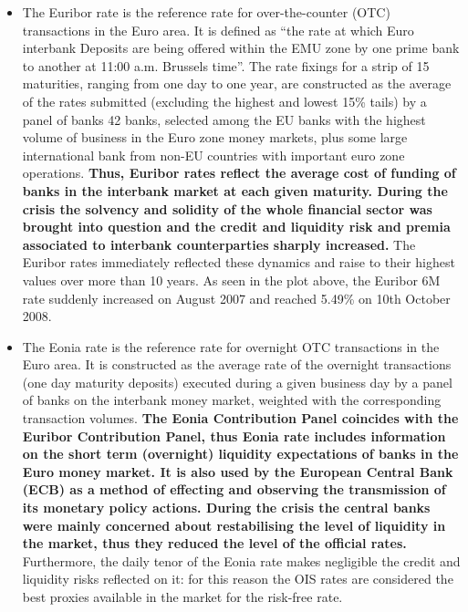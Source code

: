 \begin{itemize}
\tightlist
\item
  The Euribor rate is the reference rate for over-the-counter (OTC)
  transactions in the Euro area. It is defined as ``the rate at which
  Euro interbank Deposits are being offered within the EMU zone by one
  prime bank to another at 11:00 a.m. Brussels time''. The rate fixings
  for a strip of 15 maturities, ranging from one day to one year, are
  constructed as the average of the rates submitted (excluding the
  highest and lowest 15\% tails) by a panel of banks 42 banks, selected
  among the EU banks with the highest volume of business in the Euro
  zone money markets, plus some large international bank from non-EU
  countries with important euro zone operations. \textbf{Thus, Euribor
  rates reflect the average cost of funding of banks in the interbank
  market at each given maturity. During the crisis the solvency and
  solidity of the whole financial sector was brought into question and
  the credit and liquidity risk and premia associated to interbank
  counterparties sharply increased.} The Euribor rates immediately
  reflected these dynamics and raise to their highest values over more
  than 10 years. As seen in the plot above, the Euribor 6M rate suddenly
  increased on August 2007 and reached 5.49\% on 10th October 2008.
\item
  The Eonia rate is the reference rate for overnight OTC transactions in
  the Euro area. It is constructed as the average rate of the overnight
  transactions (one day maturity deposits) executed during a given
  business day by a panel of banks on the interbank money market,
  weighted with the corresponding transaction volumes. \textbf{The Eonia
  Contribution Panel coincides with the Euribor Contribution Panel, thus
  Eonia rate includes information on the short term (overnight)
  liquidity expectations of banks in the Euro money market. It is also
  used by the European Central Bank (ECB) as a method of effecting and
  observing the transmission of its monetary policy actions. During the
  crisis the central banks were mainly concerned about restabilising the
  level of liquidity in the market, thus they reduced the level of the
  official rates.} Furthermore, the daily tenor of the Eonia rate makes
  negligible the credit and liquidity risks reflected on it: for this
  reason the OIS rates are considered the best proxies available in the
  market for the risk-free rate.
\end{itemize}

